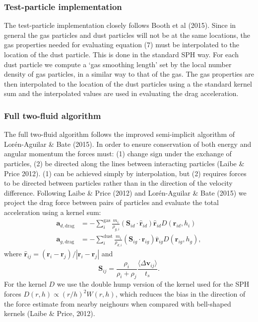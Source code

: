\documentclass[a4paper]{article}
\renewcommand{\vec}[1]{\ensuremath{\mathbf{#1}}}
\begin{document}
\subsubsection{Test-particle implementation}

The test-particle implementation closely follows Booth et al (2015). Since in general the gas particles and dust particles will not be at the same locations, the gas properties needed for evaluating equation (7) must be interpolated to the location of the dust particle. This is done in the standard SPH way. For each dust particle we compute a `gas smoothing length' set by the local number density of gas particles, in a similar way to that of the gas. The gas properties are then interpolated to the location of the dust particles using a the standard kernel sum and the interpolated values are used in evaluating the drag acceleration.

\subsubsection{Full two-fluid algorithm}

The full two-fluid algorithm follows the improved semi-implicit algorithm of Lor\'en-Aguilar \& Bate (2015). In order to ensure conservation of both energy and angular momentum the forces must: (1) change sign under the exchange of particles, (2) be directed along the lines between interacting particles (Laibe \& Price 2012). (1) can be achieved simply by interpolation, but (2) requires forces to be directed between particles rather than in the direction of the velocity difference. Following Laibe \& Price (2012) and Lor\'en-Aguilar \& Bate (2015) we project the drag force between pairs of particles and evaluate the total acceleration using a kernel sum:
\begin{align*}
 \vec{a}_{d,\mathrm{drag}} &= - \sum_i^\mathrm{gas} \frac{m_i}{\rho_{g,i}} ( \vec{S}_{id}  \cdot \vec{\hat r}_{id}) \vec{\hat r}_{id} D(\vec{r}_{id}, h_i) \\
 \vec{a}_{g,\mathrm{drag}} &= - \sum_i^\mathrm{dust} \frac{m_i}{\rho_{d,i}} ( \vec{S}_{ig} \cdot \vec{\hat r}_{ig}) \vec{\hat r}_{ig} D(\vec{r}_{ig}, h_g),
\end{align*}
where $\vec{\hat r}_{ij} = (\vec{r}_i - \vec{r}_j) / |\vec{r}_i - \vec{r}_j|$ and 
\begin{equation}
 \vec{S}_{ij} = \frac{\rho_i}{\rho_i + \rho_j} \frac{\langle \Delta \vec{v}_{ij} \rangle}{t_s}.
\end{equation}
For the kernel $D$ we use the double hump version of the kernel used for the SPH forces $D(r,h) \propto (r/h)^2 W(r,h)$, which reduces the bias in the direction of the force estimate from nearby neighours when compared with bell-shaped kernels (Laibe \& Price, 2012).
\end{document}
